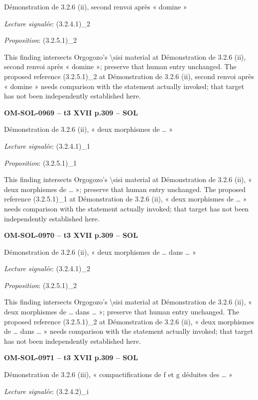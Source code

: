 Démonstration de 3.2.6 (ii), second renvoi après « domine »\par
\emph{Lecture signalée}: (3.2.4.1)\_2\par
\emph{Proposition}: (3.2.5.1)\_2\par
This finding intersects Orgogozo's \textbackslash{}sisi material at Démonstration de 3.2.6 (ii), second renvoi après « domine »; preserve that human entry unchanged. The proposed reference (3.2.5.1)\_2 at Démonstration de 3.2.6 (ii), second renvoi après « domine » needs comparison with the statement actually invoked; that target has not been independently established here.\par
\par\noindent\textbf{OM-SOL-0969 -- t3 XVII p.309 -- SOL}\par
Démonstration de 3.2.6 (ii), « deux morphismes de … »\par
\emph{Lecture signalée}: (3.2.4.1)\_1\par
\emph{Proposition}: (3.2.5.1)\_1\par
This finding intersects Orgogozo's \textbackslash{}sisi material at Démonstration de 3.2.6 (ii), « deux morphismes de … »; preserve that human entry unchanged. The proposed reference (3.2.5.1)\_1 at Démonstration de 3.2.6 (ii), « deux morphismes de … » needs comparison with the statement actually invoked; that target has not been independently established here.\par
\par\noindent\textbf{OM-SOL-0970 -- t3 XVII p.309 -- SOL}\par
Démonstration de 3.2.6 (ii), « deux morphismes de … dans … »\par
\emph{Lecture signalée}: (3.2.4.1)\_2\par
\emph{Proposition}: (3.2.5.1)\_2\par
This finding intersects Orgogozo's \textbackslash{}sisi material at Démonstration de 3.2.6 (ii), « deux morphismes de … dans … »; preserve that human entry unchanged. The proposed reference (3.2.5.1)\_2 at Démonstration de 3.2.6 (ii), « deux morphismes de … dans … » needs comparison with the statement actually invoked; that target has not been independently established here.\par
\par\noindent\textbf{OM-SOL-0971 -- t3 XVII p.309 -- SOL}\par
Démonstration de 3.2.6 (iii), « compactifications de f et g déduites des … »\par
\emph{Lecture signalée}: (3.2.4.2)\_i\par
